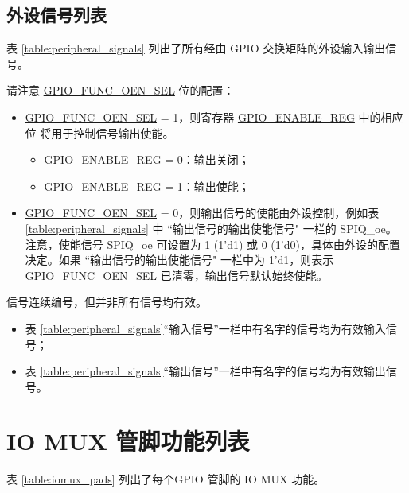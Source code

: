 \documentclass[main\_\_CN.tex]{subfiles}
\begin{document}
\begin{landscape}
\section{外设信号列表}
\label{sec:peripheral_signals}


表 \ref{table:peripheral_signals} 列出了所有经由 GPIO 交换矩阵的外设输入输出信号。

请注意 \hyperref[fielddesc:GPIOFUNCNOENSEL]{GPIO\_FUNC\_OEN\_SEL} 位的配置：

\begin{itemize}
    \item \hyperref[fielddesc:GPIOFUNCNOENSEL]{GPIO\_FUNC\_OEN\_SEL} = 1，则寄存器 \hyperref[regdesc:GPIOENABLEREG]{GPIO\_ENABLE\_REG} 中的相应位   将用于控制信号输出使能。
    \begin{itemize}
        \item \hyperref[regdesc:GPIOENABLEREG]{GPIO\_ENABLE\_REG} = 0：输出关闭；
        \item \hyperref[regdesc:GPIOENABLEREG]{GPIO\_ENABLE\_REG} = 1：输出使能；
    \end{itemize}
    \item \hyperref[fielddesc:GPIOFUNCNOENSEL]{GPIO\_FUNC\_OEN\_SEL} = 0，则输出信号的使能由外设控制，例如表 \ref{table:peripheral_signals} 中 ``输出信号的输出使能信号" 一栏的 SPIQ\_oe。注意，使能信号 SPIQ\_oe 可设置为 1 (1'd1) 或 0 (1'd0)，具体由外设的配置决定。如果 ``输出信号的输出使能信号" 一栏中为 1'd1，则表示 \hyperref[fielddesc:GPIOFUNCNOENSEL]{GPIO\_FUNC\_OEN\_SEL} 已清零，输出信号默认始终使能。
\end{itemize}

\begin{tiplisting}
信号连续编号，但并非所有信号均有效。
\vspace{-1em}
\begin{itemize}
    \item 表 \ref{table:peripheral_signals}“输入信号”一栏中有名字的信号均为有效输入信号；
    \item 表 \ref{table:peripheral_signals}“输出信号”一栏中有名字的信号均为有效输出信号。
\end{itemize}
\end{tiplisting}


\end{landscape}

\section{IO MUX 管脚功能列表}
\label{sec:iomux_pads}
表 \ref{table:iomux_pads} 列出了每个GPIO 管脚的 IO MUX 功能。
\end{document}
